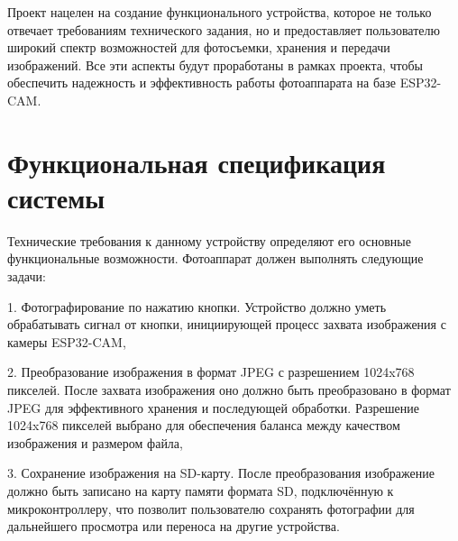 Проект нацелен на создание функционального устройства, 
которое не только отвечает требованиям технического задания, но и 
предоставляет пользователю широкий спектр возможностей для 
фотосъемки, хранения и передачи изображений. Все эти аспекты будут 
проработаны в рамках проекта, чтобы обеспечить надежность и 
эффективность работы фотоаппарата на базе ESP32-CAM.

\section{Функциональная спецификация системы}\par
\hspace*{12.5 mm}Технические требования к данному устройству определяют его 
основные функциональные возможности. Фотоаппарат должен 
выполнять следующие задачи:

1. Фотографирование по нажатию кнопки. Устройство должно уметь 
обрабатывать сигнал от кнопки, инициирующей процесс 
захвата изображения с камеры ESP32-CAM,

2. Преобразование изображения в формат JPEG с разрешением 
1024x768 пикселей. После захвата изображения оно должно быть 
преобразовано в формат JPEG для эффективного хранения и 
последующей обработки. Разрешение 1024x768 пикселей выбрано 
для обеспечения баланса между качеством изображения и размером 
файла,

3. Сохранение изображения на SD-карту. После преобразования 
изображение должно быть записано на карту памяти формата SD, 
подключённую к микроконтроллеру, что позволит пользователю 
сохранять фотографии для дальнейшего просмотра или переноса на 
другие устройства.
